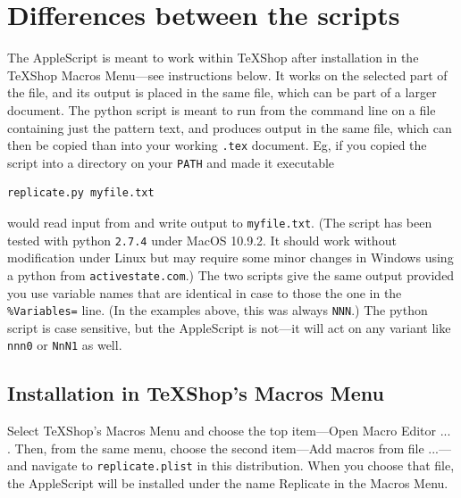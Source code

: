 \documentclass[11pt]{article}
\begin{document}
\section{Differences between the scripts}
The AppleScript is meant to work within TeXShop after installation in the TeXShop Macros Menu---see instructions below. It works on the selected part of the file, and its output is placed in the same file, which can be part of a larger document. The \textsf{python} script is meant to run from the command line on a file containing just the pattern text, and produces output in the same file, which can then be copied than into your working {\tt.tex} document. Eg, if you copied the script into a directory on your {\tt PATH} and made it executable
\begin{verbatim}
replicate.py myfile.txt
\end{verbatim}
would read input from and write output to {\tt myfile.txt}. (The script has been tested with \textsf{python} {\tt2.7.4} under MacOS 10.9.2. It should work without modification under Linux but may require some minor changes in Windows using a \textsf{python} from {\tt activestate.com}.)
The two scripts give the same output provided you use variable names that are identical in case to those the one in the \verb|%Variables=|
line. (In the examples above, this was always {\tt NNN}.) The \textsf{python} script is case sensitive, but the AppleScript is not---it will act on any variant like {\tt nnn0} or {\tt NnN1} as well.
\subsection{Installation in TeXShop's Macros Menu}
Select \TeX Shop's Macros Menu and choose the top item---\textsf{Open Macro Editor ... }. Then, from the same menu, choose the second item---\textsf{Add macros from file ...}---and navigate to {\tt replicate.plist} in this distribution. When you choose that file, the AppleScript will be installed under the name \textsf{Replicate} in the Macros Menu. 
\end{document}
